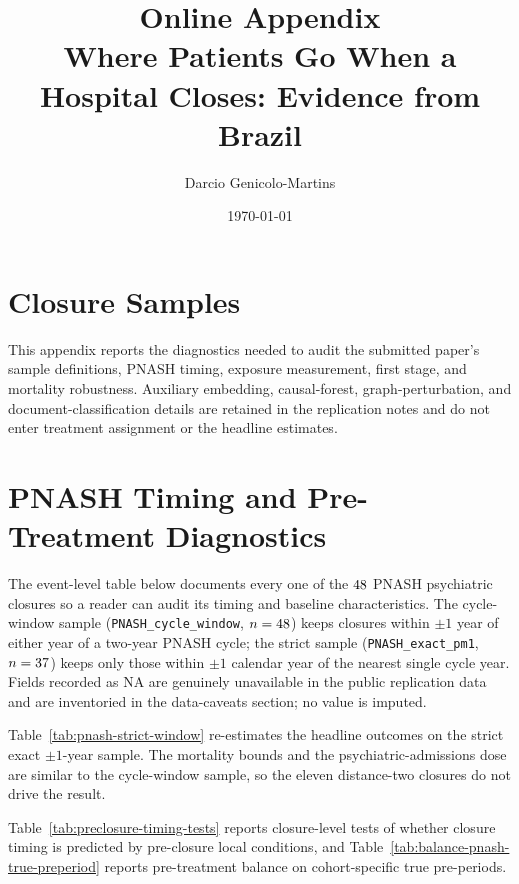\documentclass[11pt,letterpaper]{article}
\title{\textbf{Online Appendix}\\
Where Patients Go When a Hospital Closes: Evidence from Brazil}
\author{Darcio Genicolo-Martins}
\date{\today}
\begin{document}
\maketitle

\section{Closure Samples}

This appendix reports the diagnostics needed to audit the submitted
paper's sample definitions, PNASH timing, exposure measurement, first
stage, and mortality robustness. Auxiliary embedding, causal-forest,
graph-perturbation, and document-classification details are retained in
the replication notes and do not enter treatment assignment or the
headline estimates.



\section{PNASH Timing and Pre-Treatment Diagnostics}

The event-level table below documents every one of the
$48$ PNASH psychiatric closures so a reader can audit its
timing and baseline characteristics. The cycle-window sample
(\texttt{PNASH\_cycle\_window}, $n = 48$) keeps closures
within $\pm 1$ year of either year of a two-year PNASH cycle; the strict
sample (\texttt{PNASH\_exact\_pm1}, $n = 37$) keeps
only those within $\pm 1$ calendar year of the nearest single cycle year.
Fields recorded as NA are genuinely unavailable in the public replication
data and are inventoried in the data-caveats section; no value is imputed.



Table~\ref{tab:pnash-strict-window} re-estimates the headline outcomes on
the strict exact $\pm 1$-year sample. The mortality bounds and the
psychiatric-admissions dose are similar to the cycle-window sample, so the
eleven distance-two closures do not drive the result.



Table~\ref{tab:preclosure-timing-tests} reports closure-level tests of
whether closure timing is predicted by pre-closure local conditions, and
Table~\ref{tab:balance-pnash-true-preperiod} reports pre-treatment balance on
cohort-specific true pre-periods.
\end{document}

